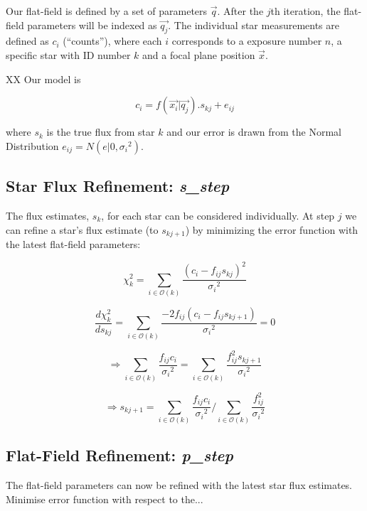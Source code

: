 \documentclass[12pt,a4paper,twoside]{article}
\begin{document}
Our flat-field is defined by a set of parameters $\vec{q}$. After the $j$th iteration, the flat-field parameters will be indexed as $\vec{q_j}$. The individual star measurements are defined as $c_i$ (``counts''), where each $i$ corresponds to a exposure number $n$, a specific star with ID number $k$ and a focal plane position $\vec{x}$.

XX Our model is

\begin{equation}
c_i = f(\vec{x_i} | \vec{q_j}) . s_{kj} + e_{ij}
\end{equation}

where $s_k$ is the true flux from star $k$ and our error is drawn from the Normal Distribution $e_{ij} = N(e|0,{\sigma_i}^2)$.

\subsection{Star Flux Refinement: \textbf{\textit{s\_step}}}
The flux estimates, $s_k$, for each star can be considered individually. At step $j$ we can refine a star's flux estimate (to $s_{kj+1}$) by minimizing the error function with the latest flat-field parameters:

\begin{equation}
\chi^2_{k} = \sum_{i \in \mathcal{O}(k)} \frac{(c_i-f_{ij}s_{kj})^2}{{\sigma_i}^2}
\end{equation}

\begin{equation}
\frac{d\chi^2_{k}}{d s_{kj}} = \sum_{i \in \mathcal{O}(k)} \frac{-2 f_{ij} (c_i-f_{ij}s_{kj+1})}{{\sigma_i}^2} = 0
\end{equation}

\begin{equation}
\Rightarrow \sum_{i \in \mathcal{O}(k)} \frac{f_{ij} c_i}{{\sigma_i}^2}= \sum_{i \in \mathcal{O}(k)} \frac{f_{ij}^2 s_{kj+1}}{{\sigma_i}^2}
\end{equation}

\begin{equation}
\Rightarrow s_{kj+1} = {\sum_{i \in \mathcal{O}(k)} \frac{f_{ij} c_i}{{\sigma_i}^2}}/{\sum_{i \in \mathcal{O}(k)} \frac{f_{ij}^2}{{\sigma_i}^2}}
\end{equation}

\subsection{Flat-Field Refinement: \textbf{\textit{p\_step}}}
The flat-field parameters can now be refined with the latest star flux estimates. Minimise error function with respect to the...
\end{document}
